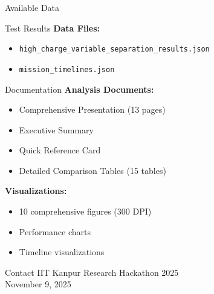 \documentclass[aspectratio=169]{beamer}
\begin{document}
\begin{frame}{Available Data}
\begin{block}{Test Results}
\textbf{Data Files:}
\begin{itemize}
    \item \texttt{high\_charge\_variable\_separation\_results.json}
    \item \texttt{mission\_timelines.json}
\end{itemize}
\end{block}

\begin{block}{Documentation}
\textbf{Analysis Documents:}
\begin{itemize}
    \item Comprehensive Presentation (13 pages)
    \item Executive Summary
    \item Quick Reference Card
    \item Detailed Comparison Tables (15 tables)
\end{itemize}

\vspace{0.2cm}
\textbf{Visualizations:}
\begin{itemize}
    \item 10 comprehensive figures (300 DPI)
    \item Performance charts
    \item Timeline visualizations
\end{itemize}
\end{block}

\begin{block}{Contact}
IIT Kanpur Research Hackathon 2025\\
November 9, 2025
\end{block}
\end{frame}
\end{document}

